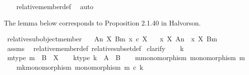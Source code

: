 \begin{isabellebody}
%
\isadelimproof
\ \ %
\endisadelimproof
%
\isatagproof
{}\isamarkupfalse%
\ relative{\isacharunderscore}{\kern0pt}member{\isacharunderscore}{\kern0pt}def\ \isamarkupfalse%
\ auto%
\endisatagproof
{\isafoldproof}%
%
\isadelimproof
%
\endisadelimproof
%
\begin{isamarkuptext}%
The lemma below corresponds to Proposition 2.1.40 in Halvorson.%
\end{isamarkuptext}\isamarkuptrue%
\isamarkupfalse%
\ relative{\isacharunderscore}{\kern0pt}subobject{\isacharunderscore}{\kern0pt}member{\isacharcolon}{\kern0pt}\isanewline
\ \ \ {\isachardoublequoteopen}{\isacharparenleft}{\kern0pt}A{\isacharcomma}{\kern0pt}n{\isacharparenright}{\kern0pt}\ {\isasymsubseteq}\isactrlbsub X\isactrlesub \ {\isacharparenleft}{\kern0pt}B{\isacharcomma}{\kern0pt}m{\isacharparenright}{\kern0pt}{\isachardoublequoteclose}\ {\isachardoublequoteopen}x\ {\isasymin}\isactrlsub c\ X{\isachardoublequoteclose}\isanewline
\ \ \ {\isachardoublequoteopen}x\ {\isasymin}\isactrlbsub X\isactrlesub \ {\isacharparenleft}{\kern0pt}A{\isacharcomma}{\kern0pt}n{\isacharparenright}{\kern0pt}\ {\isasymLongrightarrow}\ x\ {\isasymin}\isactrlbsub X\isactrlesub \ {\isacharparenleft}{\kern0pt}B{\isacharcomma}{\kern0pt}m{\isacharparenright}{\kern0pt}{\isachardoublequoteclose}\isanewline
%
\isadelimproof
\ \ %
\endisadelimproof
%
\isatagproof
{}\isamarkupfalse%
\ assms\ \isamarkupfalse%
\ relative{\isacharunderscore}{\kern0pt}member{\isacharunderscore}{\kern0pt}def{}\ relative{\isacharunderscore}{\kern0pt}subset{\isacharunderscore}{\kern0pt}def{}\isanewline
{}\isamarkupfalse%
\ clarify\isanewline
\ \ \isamarkupfalse%
\ k\isanewline
\ \ \isamarkupfalse%
\ m{\isacharunderscore}{\kern0pt}type{\isacharcolon}{\kern0pt}\ {\isachardoublequoteopen}m\ {\isacharcolon}{\kern0pt}\ B\ {\isasymrightarrow}\ X{\isachardoublequoteclose}\isanewline
\ \ \isamarkupfalse%
\ k{\isacharunderscore}{\kern0pt}type{\isacharcolon}{\kern0pt}\ {\isachardoublequoteopen}k\ {\isacharcolon}{\kern0pt}\ A\ {\isasymrightarrow}\ B{\isachardoublequoteclose}\isanewline
\ \ \isamarkupfalse%
\ m{\isacharunderscore}{\kern0pt}monomorphism{\isacharcolon}{\kern0pt}\ {\isachardoublequoteopen}monomorphism\ m{\isachardoublequoteclose}\isanewline
\ \ \isamarkupfalse%
\ mk{\isacharunderscore}{\kern0pt}monomorphism{\isacharcolon}{\kern0pt}\ {\isachardoublequoteopen}monomorphism\ {\isacharparenleft}{\kern0pt}m\ {\isasymcirc}\isactrlsub c\ k{\isacharparenright}{\kern0pt}{\isachardoublequoteclose}\isanewline

\end{isabellebody}
